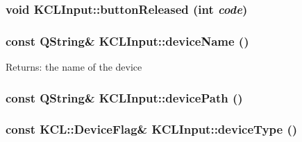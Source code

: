 \hypertarget{class_k_c_l_input_1192fa591312c7cda431b9cf9b442344}{
\subsubsection[{buttonReleased}]{\setlength{\rightskip}{0pt plus 5cm}void KCLInput::buttonReleased (int {\em code})}}
\label{class_k_c_l_input_1192fa591312c7cda431b9cf9b442344}


\hypertarget{class_k_c_l_input_cdb5cd70b2c5752586e99f6bc7508e2f}{
\subsubsection[{deviceName}]{\setlength{\rightskip}{0pt plus 5cm}const QString\& KCLInput::deviceName ()}}
\label{class_k_c_l_input_cdb5cd70b2c5752586e99f6bc7508e2f}


\begin{Desc}
\item[Returns:]the name of the device \end{Desc}
\hypertarget{class_k_c_l_input_7eed3b9f99f3ee3634693bcbe385329b}{
\subsubsection[{devicePath}]{\setlength{\rightskip}{0pt plus 5cm}const QString\& KCLInput::devicePath ()}}
\label{class_k_c_l_input_7eed3b9f99f3ee3634693bcbe385329b}


\hypertarget{class_k_c_l_input_cd334fdeddab9e5ae026e22942ebac65}{
\subsubsection[{deviceType}]{\setlength{\rightskip}{0pt plus 5cm}const {\bf KCL::DeviceFlag}\& KCLInput::deviceType ()}}
\label{class_k_c_l_input_cd334fdeddab9e5ae026e22942ebac65}


